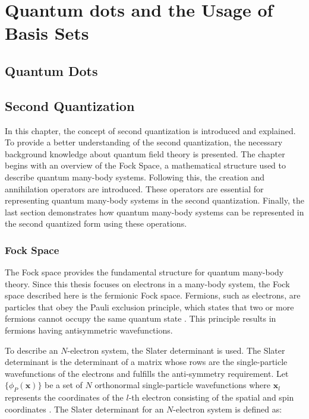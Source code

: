 \chapter{Quantum dots and the Usage of Basis Sets}
\label{c:background}

\section{Quantum Dots}

\section{Second Quantization}

In this chapter, the concept of second quantization is introduced and explained. To provide a better understanding of the second quantization, the necessary background knowledge about quantum field theory is presented.
The chapter begins with an overview of the Fock Space, a mathematical structure used to describe quantum many-body systems. Following this, the creation and annihilation operators are introduced. These operators are essential for representing quantum many-body systems in the second quantization. Finally, the last section demonstrates how quantum many-body systems can be represented in the second quantized form using these operations.

\subsection{Fock Space}
The Fock space provides the fundamental structure for quantum many-body theory. Since this thesis focuses on electrons in a many-body system, the Fock space described here is the fermionic Fock space. Fermions, such as electrons, are particles that obey the Pauli exclusion principle, which states that two or more fermions cannot occupy the same quantum state \cite{Griffiths2014}. This principle results in fermions having antisymmetric wavefunctions.

To describe an $N$-electron system, the Slater determinant is used. The Slater determinant is the determinant of a matrix whose rows are the single-particle wavefunctions of the electrons and fulfills the anti-symmetry requirement. 
Let $\{\phi_P(\textbf{x})\}$ be a set of $N$ orthonormal single-particle wavefunctions where $\textbf{x}_l$ represents the coordinates of the $l$-th electron consisting of the spatial and spin coordinates \cite{Helgaker2000}.
The Slater determinant for an $N$-electron system is defined as: 

